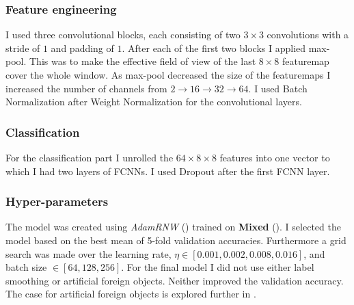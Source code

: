 \subsubsection{Feature engineering}
I used three convolutional blocks, each consisting of two $3\times3$ convolutions with a stride of $1$ and padding of $1$. 
After each of the first two blocks I applied max-pool. 
This was to make the effective field of view of the last $8\times8$ featuremap cover the whole window.
As max-pool decreased the size of the featuremaps I increased the number of channels from $2\to 16 \to 32 \to 64$.
I used Batch Normalization after Weight Normalization for the convolutional layers.
\subsubsection{Classification} 
For the classification part I unrolled the $64 \times 8 \times 8$ features into one vector to which I had two layers of \acp{FCNN}.
I used Dropout after the first \ac{FCNN} layer.
\subsubsection{Hyper-parameters}
The model was created using \textit{AdamRNW} () trained on \textbf{Mixed} ().
I selected the model based on the best mean of 5-fold validation accuracies.
Furthermore a grid search was made over the learning rate, $\eta \in [0.001,0.002,0.008,0.016]$, and batch size $\in [64,128,256]$.
For the final model I did not use either label smoothing or artificial foreign objects.
Neither improved the validation accuracy.
The case for artificial foreign objects is explored further in .
